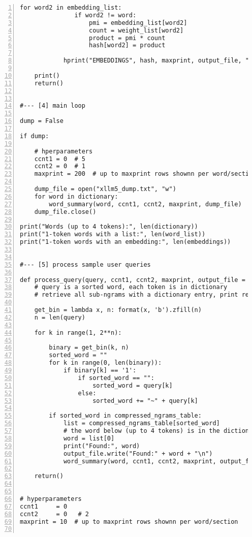 \documentclass[oneside,10pt]{book}
\begin{document}
\begin{lstlisting}[numbers=left]
            for word2 in embedding_list:
               if word2 != word:
                   pmi = embedding_list[word2]
                   count = weight_list[word2]
                   product = pmi * count
                   hash[word2] = product 
            
            hprint("EMBEDDINGS", hash, maxprint, output_file, "%8.2f %s")

    print()
    return()


#--- [4] main loop 

dump = False  
 
if dump:

    # hperparameters 
    ccnt1 = 0  # 5
    ccnt2 = 0  # 1
    maxprint = 200  # up to maxprint rows shownn per word/section
    
    dump_file = open("xllm5_dump.txt", "w")
    for word in dictionary:
        word_summary(word, ccnt1, ccnt2, maxprint, dump_file)
    dump_file.close()
     
print("Words (up to 4 tokens):", len(dictionary))
print("1-token words with a list:", len(word_list))
print("1-token words with an embedding:", len(embeddings))


#--- [5] process sample user queries 

def process_query(query, ccnt1, ccnt2, maxprint, output_file = ""):
    # query is a sorted word, each token is in dictionary
    # retrieve all sub-ngrams with a dictionary entry, print results for each one

    get_bin = lambda x, n: format(x, 'b').zfill(n)
    n = len(query)

    for k in range(1, 2**n): 

        binary = get_bin(k, n)
        sorted_word = ""
        for k in range(0, len(binary)):
            if binary[k] == '1':
                if sorted_word == "":
                    sorted_word = query[k]
                else:
                    sorted_word += "~" + query[k]

        if sorted_word in compressed_ngrams_table:
            list = compressed_ngrams_table[sorted_word]
            # the word below (up to 4 tokens) is in the dictionary
            word = list[0]
            print("Found:", word)
            output_file.write("Found:" + word + "\n")
            word_summary(word, ccnt1, ccnt2, maxprint, output_file)

    return()
   

# hyperparameters
ccnt1     = 0  
ccnt2     = 0   # 2  
maxprint = 10  # up to maxprint rows shownn per word/section 


\end{lstlisting}
\end{document}
